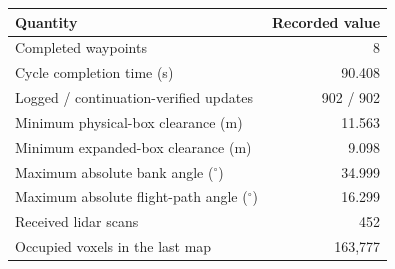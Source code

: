 \begin{tabular}{lr}
\toprule
Quantity & Recorded value \\
\midrule
Completed waypoints & 8 \\
Cycle completion time (s) & 90.408 \\
Logged / continuation-verified updates & 902 / 902 \\
Minimum physical-box clearance (m) & 11.563 \\
Minimum expanded-box clearance (m) & 9.098 \\
Maximum absolute bank angle ($^\circ$) & 34.999 \\
Maximum absolute flight-path angle ($^\circ$) & 16.299 \\
Received lidar scans & 452 \\
Occupied voxels in the last map & 163,777 \\
\bottomrule
\end{tabular}
